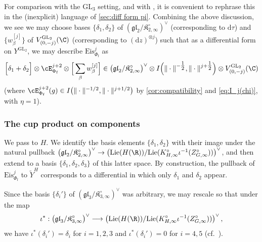 \documentclass[10pt,reqno,a4paper]{amsart}
\newcommand{\Phif}{{\Phi\subf}}
\newcommand{\subf}{_{\mathrm{f}}}
\newcommand{\GL}{\mathrm{GL}}
\begin{document}
For comparison with the $\GL_3$ setting, and with \cite{Mah98,Mah00}, it is convenient to rephrase this in the (inexplicit) language of \cref{sec:diff form pi}. Combining the above discussion, we see we may choose bases $\{\delta_1,\delta_2\}$ of $(\mathfrak{gl}_2/\mathfrak{K}_{2,\infty}^\circ)^\vee$ (corresponding to $\mathrm{d}\tau$) and $\{w_\beta^{[j]}\}$ of $V_{(0,-j)}^{\GL_2}(\C)$ (corresponding to $(\mathrm{d}z)^{\otimes j}$) such that as a differential form on $Y^{\GL_2}$, we may describe $\mathrm{Eis}_{\Phif}^{j}$ as
\begin{equation}\label{eq:diff form Eis}
\Big[\delta_1 + \delta_2\Big] \otimes \cE^{j+2}_{\Phif} \otimes \Big[\sum_\beta w_\beta^{[j]}\Big] \in \left(\mathfrak{gl}_2/\mathfrak{K}_{2,\infty}^\circ\right)^\vee \otimes I\Big(\|\cdot\|^{-\tfrac{1}{2}}, \|\cdot\|^{j+\tfrac{1}{2}}\Big) \otimes V_{(0,-j)}^{\GL_2}(\C)
\end{equation}
(where $\cE_{\Phif}^{j+2}(g) \in I \big(\|\cdot\|^{-1/2}, \|\cdot\|^{j+1/2}\big) $ by \cref{cor:compatibility} and \eqref{eq:I_j(chi)}, with $\eta = 1$).



\subsubsection{The cup product on components}
We pass to $H$. We identify the basis elements $\{\delta_1,\delta_2\}$ with their image under the natural pullback $\left(\mathfrak{gl}_2/\mathfrak{K}_{2,\infty}^\circ\right)^\vee \to \left( \mathrm{Lie}(H(\R))/\mathrm{Lie}(K_{H,\infty}^\circ \iota^{-1}(Z_{G,\infty}^\circ))\right)^\vee$, and then extend to a basis $\{\delta_1,\delta_2,\delta_3\}$ of this latter space. By construction, the pullback of $\mathrm{Eis}_{\Phif}^{j}$ to $\widetilde{Y}^H$ corresponds to a differential in which only $\delta_1$ and $\delta_2$ appear.

Since the basis $\{\delta_i'\}$ of $\left(\mathfrak{gl}_3/\mathfrak{K}_{3,\infty}^\circ\right)^\vee$ was arbitrary, we may rescale so that under the map
\[
\iota^\ast : \left(\mathfrak{gl}_3/\mathfrak{K}_{3,\infty}^\circ\right)^\vee \longrightarrow \left( \mathrm{Lie}(H(\R))/\mathrm{Lie}(K_{H,\infty}^\circ \iota^{-1}(Z_{G,\infty}^\circ))\right)^\vee,
\]
we have $\iota^\ast(\delta_i') = \delta_i$ for $i = 1,2,3$ and $\iota^\ast(\delta_i') = 0$ for $i = 4,5$ (cf.\ \cite[p.277]{Mah00}).
\end{document}
